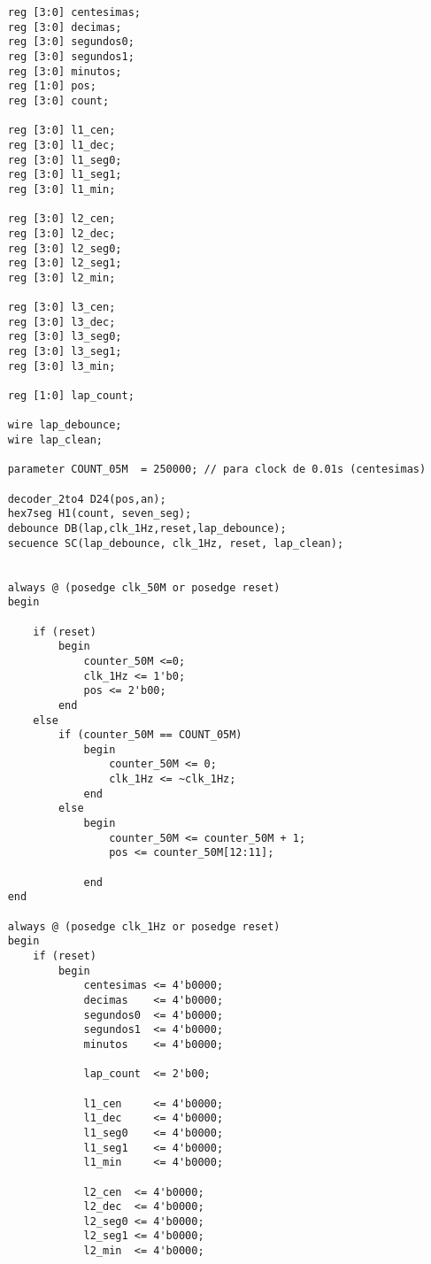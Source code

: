 \documentclass[a4paper,10pt]{article}
\begin{document}
{{\begin{verbatim}
    reg [3:0] centesimas;
    reg [3:0] decimas;
    reg [3:0] segundos0;
    reg [3:0] segundos1;
    reg [3:0] minutos;
    reg [1:0] pos;
    reg [3:0] count;
    
    reg [3:0] l1_cen;
    reg [3:0] l1_dec;
    reg [3:0] l1_seg0;
    reg [3:0] l1_seg1;
    reg [3:0] l1_min;
    
    reg [3:0] l2_cen;
    reg [3:0] l2_dec;
    reg [3:0] l2_seg0;
    reg [3:0] l2_seg1;
    reg [3:0] l2_min;
    
    reg [3:0] l3_cen;
    reg [3:0] l3_dec;
    reg [3:0] l3_seg0;
    reg [3:0] l3_seg1;
    reg [3:0] l3_min;
    
    reg [1:0] lap_count;
    
    wire lap_debounce;
    wire lap_clean;
    
    parameter COUNT_05M  = 250000; // para clock de 0.01s (centesimas)
    
    decoder_2to4 D24(pos,an);
    hex7seg H1(count, seven_seg);
    debounce DB(lap,clk_1Hz,reset,lap_debounce);
    secuence SC(lap_debounce, clk_1Hz, reset, lap_clean);

    
    always @ (posedge clk_50M or posedge reset)
    begin
    
        if (reset)
            begin
                counter_50M <=0;
                clk_1Hz <= 1'b0;
                pos <= 2'b00;
            end
        else
            if (counter_50M == COUNT_05M)
                begin
                    counter_50M <= 0;
                    clk_1Hz <= ~clk_1Hz;
                end
            else
                begin
                    counter_50M <= counter_50M + 1;
                    pos <= counter_50M[12:11];
    
                end
    end
    
    always @ (posedge clk_1Hz or posedge reset)
    begin
        if (reset)
            begin
                centesimas <= 4'b0000;
                decimas    <= 4'b0000;
                segundos0  <= 4'b0000;
                segundos1  <= 4'b0000;
                minutos    <= 4'b0000;
    
                lap_count  <= 2'b00;
    
                l1_cen     <= 4'b0000;
                l1_dec     <= 4'b0000;
                l1_seg0    <= 4'b0000;
                l1_seg1    <= 4'b0000;
                l1_min     <= 4'b0000;
                
                l2_cen  <= 4'b0000;
                l2_dec  <= 4'b0000;
                l2_seg0 <= 4'b0000;
                l2_seg1 <= 4'b0000;
                l2_min  <= 4'b0000;
                

\end{verbatim}}}
\end{document}
